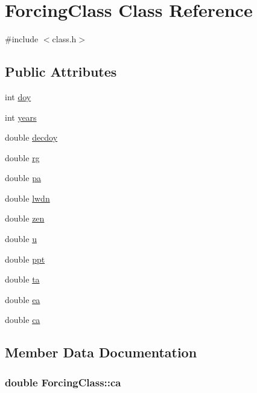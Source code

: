 \hypertarget{class_forcing_class}{}\section{Forcing\+Class Class Reference}
\label{class_forcing_class}


{\ttfamily \#include $<$class.\+h$>$}

\subsection*{Public Attributes}
\begin{DoxyCompactItemize}
\item 
int \hyperlink{class_forcing_class_af75ef02104ded3290f2531b0dd070aad}{doy}
\item 
int \hyperlink{class_forcing_class_a4100182ae2e6b94113197d349d87244e}{years}
\item 
double \hyperlink{class_forcing_class_a6dfdad76c0c83e470450a267b77a28ae}{decdoy}
\item 
double \hyperlink{class_forcing_class_a532729ddef9c5b7bc69a9047dae1c846}{rg}
\item 
double \hyperlink{class_forcing_class_a9fc1f813ae17e482971cc66e73bd80d9}{pa}
\item 
double \hyperlink{class_forcing_class_a54e07049034f2a52c18ee375ff54d9cc}{lwdn}
\item 
double \hyperlink{class_forcing_class_adadc2319d24d420e89dc8757afc87242}{zen}
\item 
double \hyperlink{class_forcing_class_ad22655f39b8411e4ef5dd9d52c76f465}{u}
\item 
double \hyperlink{class_forcing_class_af300b8a3856af66e26a23299d7534a7f}{ppt}
\item 
double \hyperlink{class_forcing_class_aece37700263c8924187312ba098cd62b}{ta}
\item 
double \hyperlink{class_forcing_class_a2ef818992d6ec8a7b72f0436753d4504}{ea}
\item 
double \hyperlink{class_forcing_class_a3124425102707b9afcebac601c135ca0}{ca}
\end{DoxyCompactItemize}


\subsection{Member Data Documentation}
\subsubsection[{\texorpdfstring{ca}{ca}}]{\setlength{\rightskip}{0pt plus 5cm}double Forcing\+Class\+::ca}\hypertarget{class_forcing_class_a3124425102707b9afcebac601c135ca0}{}\label{class_forcing_class_a3124425102707b9afcebac601c135ca0}

